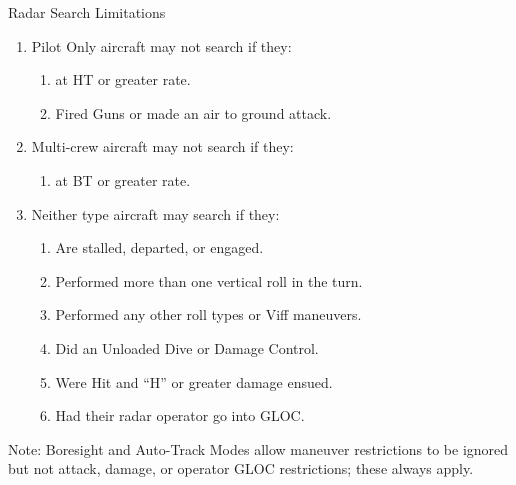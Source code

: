 \begin{table}
\centering
\caption{Radar Search Limitations}
\medskip
\begin{minipage}{\linewidth}
\begin{enumerate}
    \item Pilot Only aircraft may not search if they:
    \begin{enumerate}
        \item {} at HT or greater rate.
        \item Fired Guns or made an air to ground attack.
    \end{enumerate}
    \item Multi-crew aircraft may not search if they:
    \begin{enumerate}
        \item {} at BT or greater rate.
    \end{enumerate}    
    \item Neither type aircraft may search if they:
    \begin{enumerate}
        \item Are stalled, departed, or engaged.
        \item Performed more than one vertical roll in the turn.
        \item Performed any other roll types or Viff maneuvers.
        \item Did an Unloaded Dive or Damage Control.
        \item Were Hit and “H” or greater damage ensued.
        \item Had their radar operator go into GLOC.
    \end{enumerate}        
\end{enumerate}
\medskip
Note: Boresight and Auto-Track Modes allow maneuver restrictions to be ignored but not attack, damage, or operator GLOC restrictions; these always apply.
\end{minipage}
\end{table}

